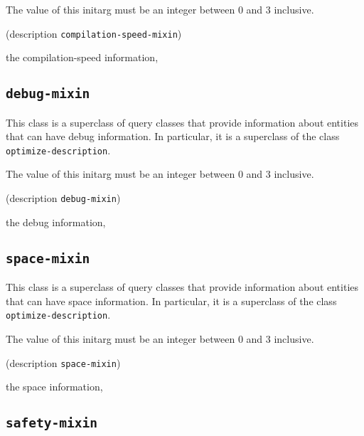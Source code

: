 The value of this initarg must be an integer between $0$ and $3$
inclusive.

{\footnotesize
{} {(description {\tt compilation-speed-mixin})}
}

 the compilation-speed information, 

\subsection{\texttt{debug-mixin}}
\label{sec-debug-mixin}

{\footnotesize
{}
}
This class is a superclass of query classes that provide information
about entities that can have debug information.  In particular, it is a
superclass of the class \texttt{optimize-description}.

{\footnotesize
{}
}

The value of this initarg must be an integer between $0$ and $3$
inclusive.

{\footnotesize
{} {(description {\tt debug-mixin})}
}

 the debug information, 

\subsection{\texttt{space-mixin}}
\label{sec-space-mixin}

{\footnotesize
{}
}

This class is a superclass of query classes that provide information
about entities that can have space information.  In particular, it is a
superclass of the class \texttt{optimize-description}.

{\footnotesize
{}
}

The value of this initarg must be an integer between $0$ and $3$
inclusive.

{\footnotesize
{} {(description {\tt space-mixin})}
}

 the space information, 

\subsection{\texttt{safety-mixin}}
\label{sec-safety-mixin}

{\footnotesize
{}
}

